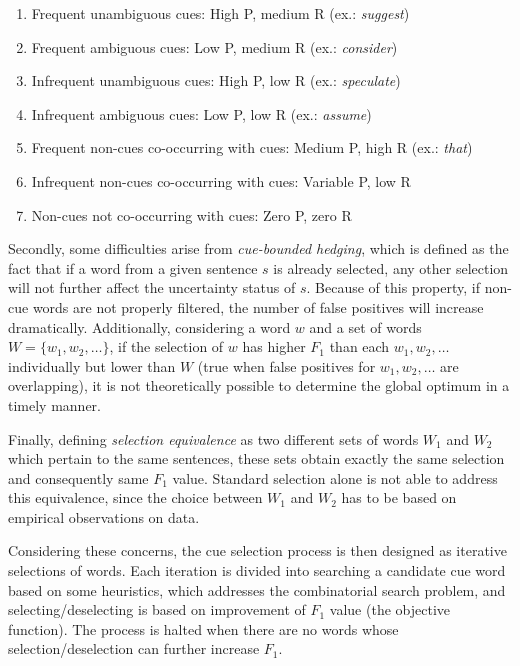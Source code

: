 \documentclass[english]{jnlp_1.4}
\begin{document}
\begin{enumerate}
	\item\label{itm:fuc} Frequent unambiguous cues: High P, medium R (ex.: \emph{suggest})
	\item\label{itm:fac} Frequent ambiguous cues: Low P, medium R (ex.: \emph{consider})
	\item\label{itm:iuc} Infrequent unambiguous cues: High P, low R (ex.: \emph{speculate})
	\item\label{itm:iac} Infrequent ambiguous cues: Low P, low R (ex.: \emph{assume})
	\item\label{itm:fn} Frequent non-cues co-occurring with cues: Medium P, high R (ex.: \emph{that})
	\item\label{itm:in} Infrequent non-cues co-occurring with cues: Variable P, low R
	\item\label{itm:n} Non-cues not co-occurring with cues: Zero P, zero R
\end{enumerate}

Secondly, some difficulties arise from \emph{cue-bounded hedging}, which is defined as the fact that if a word from a given sentence $s$ is already selected, any other selection will not further affect the uncertainty status of $s$. Because of this property, if non-cue words are not properly filtered, the number of false positives will increase dramatically. Additionally, considering a word $w$ and a set of words $W=\{w_1, w_2, \ldots\}$, if the selection of $w$ has higher $F_1$ than each $w_1, w_2, \ldots$ individually but lower than $W$ (true when false positives for $w_1, w_2, \ldots$  are overlapping), it is not theoretically possible to determine the global optimum in a timely manner.

Finally, defining \emph{selection equivalence} as two different sets of words $W_1$ and $W_2$ which pertain to the same sentences, these sets obtain exactly the same selection and consequently same $F_1$ value. Standard selection alone is not able to address this equivalence, since the choice between $W_1$ and $W_2$ has to be based on empirical observations on data.

Considering these concerns, the cue selection process is then designed as iterative selections of words. Each iteration is divided into searching a candidate cue word based on some heuristics, which addresses the combinatorial search problem, and selecting/deselecting is based on improvement of $F_1$ value (the objective function). The process is halted when there are no words whose selection/deselection can further increase $F_1$.
\end{document}
